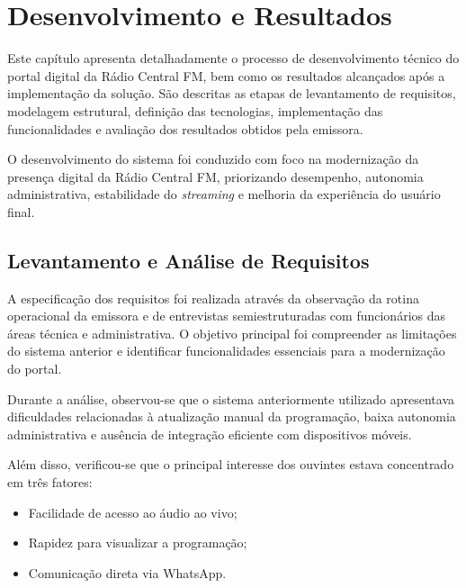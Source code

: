 \documentclass[12pt, openright, oneside, a4paper, brazil]{ads-unipac-abntex2}
\begin{document}
\chapter[Desenvolvimento e Resultados]{Desenvolvimento e Resultados}

Este capítulo apresenta detalhadamente o processo de desenvolvimento técnico do portal digital da Rádio Central FM, bem como os resultados alcançados após a implementação da solução. São descritas as etapas de levantamento de requisitos, modelagem estrutural, definição das tecnologias, implementação das funcionalidades e avaliação dos resultados obtidos pela emissora.

O desenvolvimento do sistema foi conduzido com foco na modernização da presença digital da Rádio Central FM, priorizando desempenho, autonomia administrativa, estabilidade do \textit{streaming} e melhoria da experiência do usuário final.


\section{Levantamento e Análise de Requisitos}

A especificação dos requisitos foi realizada através da observação da rotina operacional da emissora e de entrevistas semiestruturadas com funcionários das áreas técnica e administrativa. O objetivo principal foi compreender as limitações do sistema anterior e identificar funcionalidades essenciais para a modernização do portal.

Durante a análise, observou-se que o sistema anteriormente utilizado apresentava dificuldades relacionadas à atualização manual da programação, baixa autonomia administrativa e ausência de integração eficiente com dispositivos móveis.

Além disso, verificou-se que o principal interesse dos ouvintes estava concentrado em três fatores:

\begin{itemize}
    \item Facilidade de acesso ao áudio ao vivo;
    \item Rapidez para visualizar a programação;
    \item Comunicação direta via WhatsApp.
\end{itemize}
\end{document}
